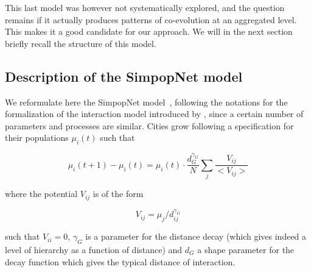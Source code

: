 This last model was however not systematically explored, and the question remains if it actually produces patterns of co-evolution at an aggregated level. This makes it a good candidate for our approach. We will in the next section briefly recall the structure of this model.



\subsection{Description of the SimpopNet model}


We reformulate here the SimpopNet model~\cite{schmitt2014modelisation}, following the notations for the formalization of the interaction model introduced by \cite{raimbault2018indirect}, since a certain number of parameters and processes are similar. Cities grow following a specification for their populations $\mu_i(t)$ such that

\begin{equation}
\mu_i(t+1) - \mu_i (t) = \mu_i (t) \cdot \frac{d_G^{\gamma_G}}{N} \sum_{j} \frac{V_{ij}}{<V_{ij}>}
\end{equation}

where the potential $V_{ij}$ is of the form 

\begin{equation}
V_{ij} = \mu_j / d_{ij}^{\gamma_G}
\end{equation}

such that $V_{ii}=0$, $\gamma_G$ is a parameter for the distance decay (which gives indeed a level of hierarchy as a function of distance) and $d_G$ a shape parameter for the decay function which gives the typical distance of interaction.


